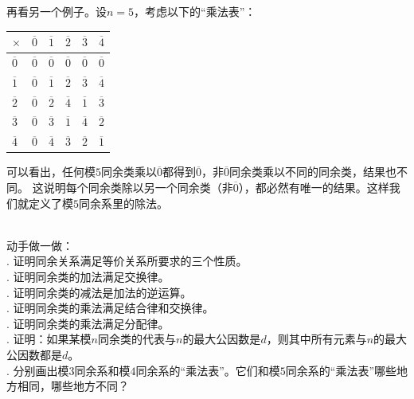 \documentclass[12pt,UTF8,fontset=none]{ctexbook}
\begin{document}
再看另一个例子。设$n=5$，考虑以下的“乘法表”：
\begin{center}
    \begin{tabular}{ | p{2em}<{\centering} | p{2em}<{\centering} | p{2em}<{\centering} | p{2em}<{\centering} | p{2em}<{\centering} | p{2em}<{\centering} | }
        \hline
            $\times$   & $\overline{0}$ & $\overline{1}$ & $\overline{2}$ & $\overline{3}$ & $\overline{4}$ \\ [0.5ex] 
        \hline
        $\overline{0}$ & $\overline{0}$ & $\overline{0}$ & $\overline{0}$ & $\overline{0}$ & $\overline{0}$ \\  
        \hline
        $\overline{1}$ & $\overline{0}$ & $\overline{1}$ & $\overline{2}$ & $\overline{3}$ & $\overline{4}$ \\
        \hline
        $\overline{2}$ & $\overline{0}$ & $\overline{2}$ & $\overline{4}$ & $\overline{1}$ & $\overline{3}$ \\
        \hline
        $\overline{3}$ & $\overline{0}$ & $\overline{3}$ & $\overline{1}$ & $\overline{4}$ & $\overline{2}$ \\
        \hline 
        $\overline{4}$ & $\overline{0}$ & $\overline{4}$ & $\overline{3}$ & $\overline{2}$ & $\overline{1}$ \\
        \hline
    \end{tabular}
\end{center}

可以看出，任何模$5$同余类乘以$\overline{0}$都得到$\overline{0}$，非$\overline{0}$同余类乘以不同的同余类，结果也不同。
这说明每个同余类除以另一个同余类（非$\overline{0}$），都必然有唯一的结果。这样我们就定义了模$5$同余系里的除法。

\begin{xt}\label{xt:3-0-0}
    \mbox{}\\
    动手做一做：\\
    . 证明同余关系满足等价关系所要求的三个性质。 \\
    . 证明同余类的加法满足交换律。 \\
    . 证明同余类的减法是加法的逆运算。\\
    . 证明同余类的乘法满足结合律和交换律。\\
    . 证明同余类的乘法满足分配律。\\
    . 证明：如果某模$n$同余类的代表与$n$的最大公因数是$d$，则其中所有元素与$n$的最大公因数都是$d$。\\
    . 分别画出模$3$同余系和模$4$同余系的“乘法表”。它们和模$5$同余系的“乘法表”哪些地方相同，哪些地方不同？
\end{xt}
\end{document}
